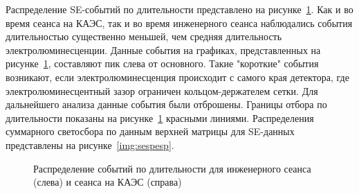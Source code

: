 Распределение SE-событий по длительности представлено на рисунке~\ref{img:seduration}. Как и во время сеанса на КАЭС, так и во время инженерного сеанса наблюдались события длительностью существенно меньшей, чем средняя длительность электролюминесценции. Данные события на графиках, представленных на рисунке~\ref{img:seduration}, составляют пик слева от основного. Такие "короткие" события возникают, если электролюминесценция происходит с самого края детектора, где электролюминесцентный зазор ограничен кольцом-держателем сетки. Для дальнейшего анализа данные события были отброшены. Границы отбора по длительности показаны на рисунке~\ref{img:seduration} красными линиями. Распределения суммарного светосбора по данным верхней матрицы для SE-данных представлены на рисунке~\ref{img:sespesp}.
\begin{figure}[ht]
  \begin{minipage}[ht]{0.49\linewidth}    
  \end{minipage}
  \hfill
  \begin{minipage}[ht]{0.49\linewidth}  
  \end{minipage}
  \caption{Распределение событий по длительности для инженерного сеанса (слева) и сеанса на КАЭС (справа)}
  \label{img:seduration}  
\end{figure}

